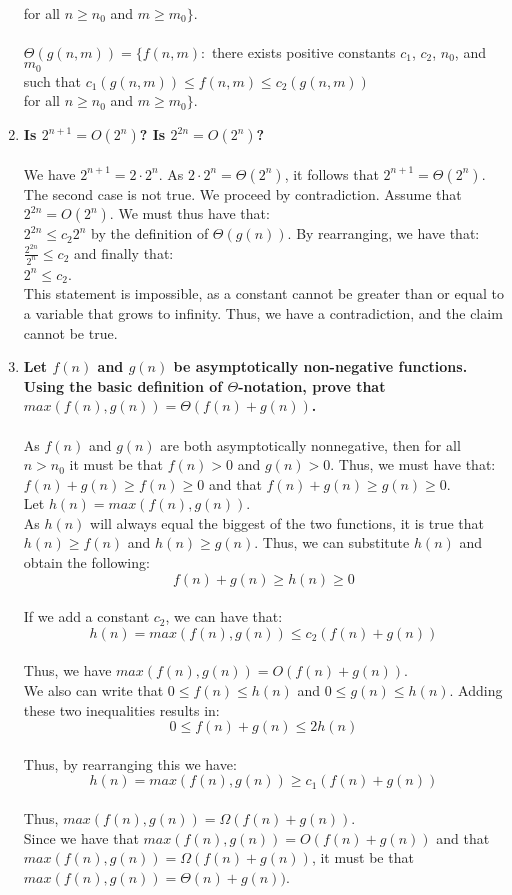 \documentclass{article}
\begin{document}
\begin{enumerate}
		\\ for all $n\geq n_0$ and $m\geq m_0\}$. 
		\\ \\ $\Theta(g(n,m))=\{ f(n,m): $ there exists positive constants $c_1$, $c_2$, $n_0$, and $m_0$
		\\ such that $c_1(g(n,m))\leq f(n,m)\leq c_2(g(n,m))$
		\\ for all $n\geq n_0$ and $m\geq m_0\}$. 
	\item \textbf{Is $2^{n+1}=O(2^n)$? Is $2^{2n}=O(2^n)$?}
		\\ \\ We have $2^{n+1}=2\cdot2^n$. As $2\cdot 2^n = \Theta(2^n)$, it follows that $2^{n+1} = \Theta(2^n)$.
		\\ The second case is not true. We proceed by contradiction. Assume that $2^{2n}=O(2^n)$. We must thus have that:
		\\ $2^{2n}\leq c_2 2^n$ by the definition of $\Theta(g(n))$. By rearranging, we have that:
		\\ $\frac{2^{2n}}{2^n}\leq c_2 $ and finally that:
		\\ $2^n \leq c_2 $.
		\\ This statement is impossible, as a constant cannot be greater than or equal to a variable that grows to infinity. Thus, we have a contradiction, and the claim cannot be true.
	\setcounter{enumi}{5}
	\item \textbf{Let $f(n)$ and $g(n)$ be asymptotically non-negative functions. Using the basic definition of $\Theta$-notation, prove  that $max(f(n),g(n))= \Theta(f(n)+g(n))$.} \\
	\\ As $f(n)$ and $g(n)$ are both asymptotically nonnegative, then for all $n>n_0$ it must be that $f(n)>0$ and $g(n)>0$. Thus, we must have that:
	\\ $f(n)+g(n)\geq f(n) \geq 0$ and that $f(n)+g(n)\geq g(n) \geq 0$.
	\\ Let $h(n)=max(f(n),g(n))$.
	\\ As $h(n)$ will always equal the biggest of the two functions, it is true that $h(n)\geq f(n)$ and $h(n)\geq g(n)$. Thus, we can substitute $h(n)$ and obtain the following:
	\\ $$f(n)+g(n)\geq h(n) \geq 0$$
	\\ If we add a constant $c_2$, we can have that:
	\\ $$h(n)=max(f(n),g(n))\leq c_2(f(n)+g(n))$$ 
	\\ Thus, we have $max(f(n),g(n))= O(f(n)+g(n))$.
	\\ We also can write that $0 \leq f(n) \leq h(n)$ and $0 \leq g(n) \leq h(n)$. Adding these two inequalities results in:
	\\ $$0\leq f(n)+g(n)\leq 2h(n)$$
	\\ Thus, by rearranging this we have:
	\\ $$h(n)=max(f(n),g(n))\geq c_1(f(n)+g(n))$$
	\\ Thus, $max(f(n),g(n))= \Omega(f(n)+g(n))$.
	\\ Since we have that $max(f(n),g(n))= O(f(n)+g(n))$ and that $max(f(n),g(n))= \Omega(f(n)+g(n))$, it must be that $max(f(n),g(n))= \Theta(n)+g(n))$.
\end{enumerate}
\end{document}
